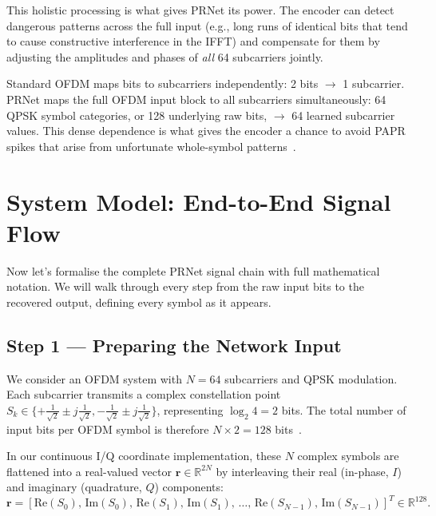 This holistic processing is what gives PRNet its power.  The encoder can detect dangerous patterns across the full input (e.g., long runs of identical bits that tend to cause constructive interference in the IFFT) and compensate for them by adjusting the amplitudes and phases of \emph{all} 64 subcarriers jointly.

\begin{keyinsight}
    Standard OFDM maps bits to subcarriers independently: 2 bits $\to$ 1 subcarrier.  PRNet maps the full OFDM input block to all subcarriers simultaneously: 64 QPSK symbol categories, or 128 underlying raw bits, $\to$ 64 learned subcarrier values.  This dense dependence is what gives the encoder a chance to avoid PAPR spikes that arise from unfortunate whole-symbol patterns~\cite{kim2017novel}.
\end{keyinsight}


\section{System Model: End-to-End Signal Flow}

Now let's formalise the complete PRNet signal chain with full mathematical notation.  We will walk through every step from the raw input bits to the recovered output, defining every symbol as it appears.


\subsection{Step 1 --- Preparing the Network Input}

We consider an OFDM system with $N = 64$ subcarriers and QPSK modulation. Each subcarrier transmits a complex constellation point $S_k \in \{+\frac{1}{\sqrt{2}} \pm j \frac{1}{\sqrt{2}}, -\frac{1}{\sqrt{2}} \pm j \frac{1}{\sqrt{2}}\}$, representing $\log_2 4 = 2$ bits. The total number of input bits per OFDM symbol is therefore $N \times 2 = 128$ bits~\cite{kim2017novel}.

In our continuous I/Q coordinate implementation, these $N$ complex symbols are flattened into a real-valued vector $\bm{r} \in \mathbb{R}^{2N}$ by interleaving their real (in-phase, $I$) and imaginary (quadrature, $Q$) components:
\begin{equation*}
    \bm{r} = \left[\mathrm{Re}(S_0),\, \mathrm{Im}(S_0),\, \mathrm{Re}(S_1),\, \mathrm{Im}(S_1),\, \dots,\, \mathrm{Re}(S_{N-1}),\, \mathrm{Im}(S_{N-1})\right]^T \in \mathbb{R}^{128}.
\end{equation*}

